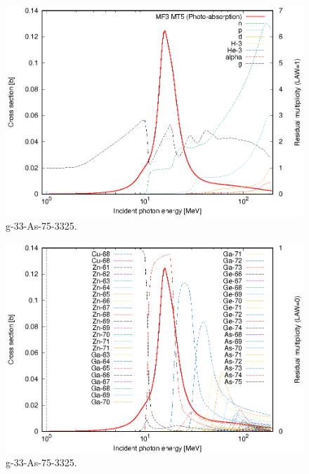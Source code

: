 \begin{figure}
 \includegraphics[width=\linewidth]{eps/g_33-As-75_3325.eps}
  \caption{g-33-As-75-3325.}
\end{figure}
\begin{figure}
 \includegraphics[width=\linewidth]{eps-law0/g_33-As-75_3325.eps}
 \caption{g-33-As-75-3325.}
\end{figure}
\newpage \clearpage

